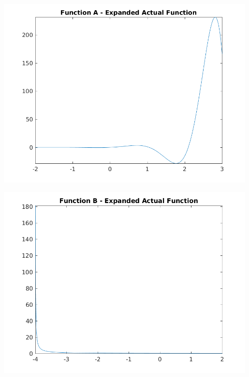 \documentclass[a4paper]{article}
\begin{document}
\begin{center}
    \centering
    \begin{minipage}{0.5\textwidth}
        \centering
        \includegraphics[width=0.99\textwidth]{../output/a_expanded_actual.png}
    \end{minipage}\hfill
    \begin{minipage}{0.5\textwidth}
        \centering
        \includegraphics[width=0.99\textwidth]{../output/b_expanded_actual.png}
    \end{minipage}
	\label{fig:expanded}

\end{center}



\newpage


\end{document}
